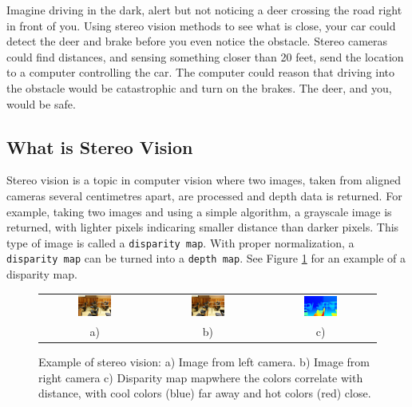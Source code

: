 \documentclass[11pt,fleqn]{article}
\begin{document}
Imagine driving in the dark, alert but not noticing a deer crossing the road right in front of you. Using stereo vision methods to see what is close, your car could detect the deer and brake before you even notice the obstacle. Stereo cameras could find distances, and sensing something closer than 20 feet, send the location to a computer controlling the car. The computer could reason that driving into the obstacle would be catastrophic and turn on the brakes. The deer, and you, would be safe.

\subsection{What is Stereo Vision}

Stereo vision is a topic in computer vision where two images, taken from aligned cameras several centimetres apart, are processed and depth data is returned. For example, taking two images and using a simple algorithm, a grayscale image is returned, with lighter pixels indicaring smaller distance than darker pixels. This type of image is called a \texttt{disparity map}. With proper normalization, a \texttt{disparity map} can be turned into a \texttt{depth map}. See Figure \ref{fig:example1} for an example of a disparity map.

\begin{figure}[!h]
\begin{mdframed}
\centering
\setlength{}
\begin{tabular}{ccc}
\includegraphics[width=0.32\textwidth]{images/im0-600.jpg} &
\includegraphics[width=0.32\textwidth]{images/im1-600.jpg} &
\includegraphics[width=0.32\textwidth]{images/disp-600.jpg} \\[2pt]
a) & b) & c)
\end{tabular}
\caption[Example of stereo vision]{Example of stereo vision: a) Image from left camera. b) Image from right camera c) Disparity map mapwhere the colors correlate with distance, with cool colors (blue) far away and hot colors (red) close.}
\label{fig:example1}
\end{mdframed}
\end{figure}
\end{document}
